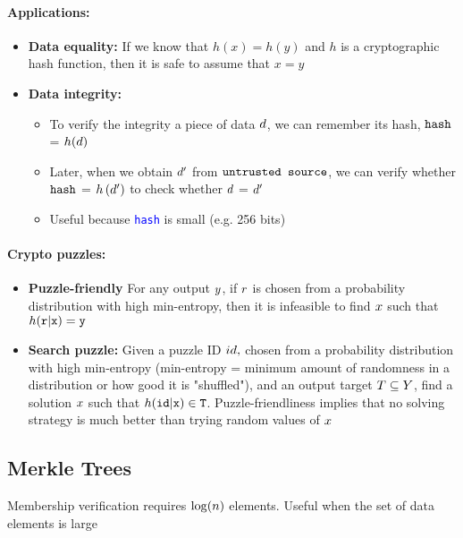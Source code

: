 \paragraph{Applications: }
\begin{itemize}
    \item \textbf{Data equality: } If we know that $h(x)=h(y)$ and $h$ is a cryptographic hash function, then it is safe to assume that $x=y$
    \item \textbf{Data integrity: } 
    \begin{itemize}
        \item To verify the integrity a piece of data $\color{blue}d$, we can remember its hash, $\texttt{\textcolor{blue}{hash}}$ = $\textcolor{blue}{h}(d)$
        \item Later, when we obtain $\color{red}d^{\prime}$ from $\texttt{\textcolor{red}{untrusted source}}$, we can verify whether $\texttt{\textcolor{blue}{hash}}$ = $\color{red}h\left(d^{\prime}\right)$ to check whether $\color{blue}d$ = $\color{red}d^{\prime}$
        \item Useful because \texttt{\textcolor{blue}{hash}} is small (e.g. 256 bits)
    \end{itemize}{}
\end{itemize}{}
\paragraph{Crypto puzzles: }
\begin{itemize}
    \item \textbf{Puzzle-friendly} For any output $\color{blue}y$, if $\color{red}r$ is chosen from a probability distribution with high min-entropy, then it is infeasible to find $\color{green}x$ such that $h(\texttt{\textcolor{red}{r}} | \texttt{\textcolor{green}{x}})=\texttt{\textcolor{blue}{y}}$
    \item \textbf{Search puzzle:} Given a puzzle ID $\color{blue}id,$ chosen from a probability distribution with high min-entropy (min-entropy = minimum amount of randomness in a distribution or how good it is "shuffled"), and an output target $\color{blue}T \subseteq Y$, find a solution $\color{green}x$ such that $h(\texttt{\textcolor{blue}{id}} | \texttt{\textcolor{green}{x}}) \in \texttt{\textcolor{blue}{T}}$. Puzzle-friendliness implies that no solving strategy is much better than trying random values of $\color{green}x$
\end{itemize}{}
\subsection{Merkle Trees}
\begin{minipage}{.5\linewidth}
    \centering      
    \def\svgwidth{\columnwidth}
        
\end{minipage}
\begin{minipage}{.5\linewidth}
    \centering      
    \def\svgwidth{\columnwidth}
        
\end{minipage}
Membership verification requires $\color{blue}\log (n)$ elements. Useful when the set of data elements is large
